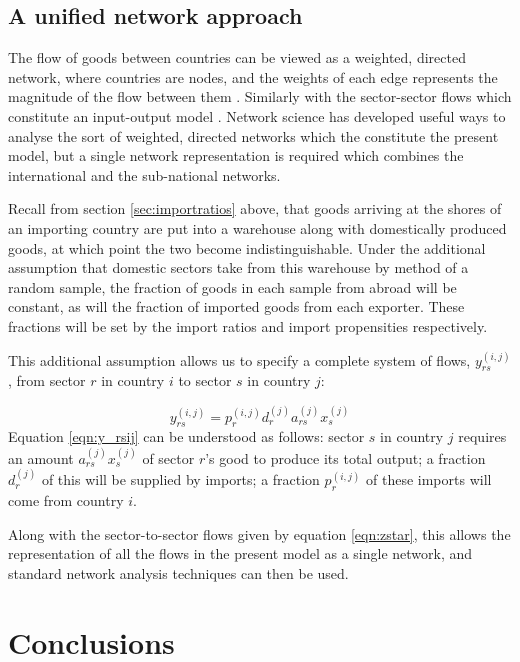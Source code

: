 \documentclass[a4paper]{article}
\begin{document}
\subsection*{A unified network approach}
The flow of goods between countries can be viewed as a weighted, directed network, where countries are nodes, and the weights of each edge represents the magnitude of the flow between them \parencite{Nystuen1961,Serrano2003,Bhattacharya2008,Baskaran2011}.
Similarly with the sector-sector flows which constitute an input-output model \parencite{Blochl2011}.
Network science has developed useful ways to analyse the sort of weighted, directed networks which the constitute the present model, but a single network representation is required which combines the international and the sub-national networks.

Recall from section \ref{sec:importratios} above, that goods arriving at the shores of an importing country are put into a warehouse along with domestically produced goods, at which point the two become indistinguishable.
Under the additional assumption that domestic sectors take from this warehouse by method of a random sample, the fraction of goods in each sample from abroad will be constant, as will the fraction of imported goods from each exporter.
These fractions will be set by the import ratios and import propensities respectively.

This additional assumption allows us to specify a complete system of flows, $y_{rs}^{(i,j)}$, from sector $r$ in country $i$ to sector $s$ in country $j$:

\begin{equation}\label{eqn:y_rsij}
y_{rs}^{(i,j)} = p_{r}^{(i,j)} d_{r}^{(j)} a_{rs}^{(j)} x_{s}^{(j)}
\end{equation}
Equation \eqref{eqn:y_rsij} can be understood as follows:
sector $s$ in country $j$ requires an amount $a_{rs}^{(j)} x_{s}^{(j)}$ of sector $r$'s good to produce its total output;
a fraction $d_{r}^{(j)}$ of this will be supplied by imports;
a fraction $p_{r}^{(i,j)}$ of these imports will come from country $i$.

Along with the sector-to-sector flows given by equation \eqref{eqn:zstar}, this allows the representation of all the flows in the present model as a single network, and standard network analysis techniques can then be used.

\section{Conclusions}\label{sec:conclusions}

\printbibliography
\end{document}

